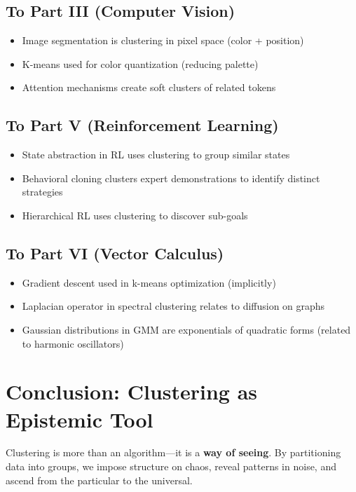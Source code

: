 \subsection{To Part III (Computer Vision)}
\begin{itemize}
    \item Image segmentation is clustering in pixel space (color + position)
    \item K-means used for color quantization (reducing palette)
    \item Attention mechanisms create soft clusters of related tokens
\end{itemize}

\subsection{To Part V (Reinforcement Learning)}
\begin{itemize}
    \item State abstraction in RL uses clustering to group similar states
    \item Behavioral cloning clusters expert demonstrations to identify distinct strategies
    \item Hierarchical RL uses clustering to discover sub-goals
\end{itemize}

\subsection{To Part VI (Vector Calculus)}
\begin{itemize}
    \item Gradient descent used in k-means optimization (implicitly)
    \item Laplacian operator in spectral clustering relates to diffusion on graphs
    \item Gaussian distributions in GMM are exponentials of quadratic forms (related to harmonic oscillators)
\end{itemize}

\section{Conclusion: Clustering as Epistemic Tool}

Clustering is more than an algorithm---it is a \textbf{way of seeing}. By partitioning data into groups, we impose structure on chaos, reveal patterns in noise, and ascend from the particular to the universal.

